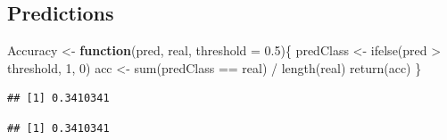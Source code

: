 \documentclass[
]{article}
\newenvironment{Shaded}{\begin{snugshade}}{\end{snugshade}}
\newcommand{\AttributeTok}[1]{\textcolor[rgb]{0.77,0.63,0.00}{#1}}
\newcommand{\ControlFlowTok}[1]{\textcolor[rgb]{0.13,0.29,0.53}{\textbf{#1}}}
\newcommand{\DecValTok}[1]{\textcolor[rgb]{0.00,0.00,0.81}{#1}}
\newcommand{\FloatTok}[1]{\textcolor[rgb]{0.00,0.00,0.81}{#1}}
\newcommand{\FunctionTok}[1]{\textcolor[rgb]{0.00,0.00,0.00}{#1}}
\newcommand{\NormalTok}[1]{#1}
\newcommand{\OtherTok}[1]{\textcolor[rgb]{0.56,0.35,0.01}{#1}}
\newcommand{\SpecialCharTok}[1]{\textcolor[rgb]{0.00,0.00,0.00}{#1}}
\begin{document}
\hypertarget{predictions}{%
\subsection{Predictions}\label{predictions}}

\begin{Shaded}
\begin{Highlighting}[]
\NormalTok{Accuracy }\OtherTok{\textless{}{-}} \ControlFlowTok{function}\NormalTok{(pred, real, }\AttributeTok{threshold =} \FloatTok{0.5}\NormalTok{)\{}
\NormalTok{  predClass }\OtherTok{\textless{}{-}}  \FunctionTok{ifelse}\NormalTok{(pred }\SpecialCharTok{\textgreater{}}\NormalTok{ threshold, }\DecValTok{1}\NormalTok{, }\DecValTok{0}\NormalTok{)}
\NormalTok{  acc }\OtherTok{\textless{}{-}} \FunctionTok{sum}\NormalTok{(predClass }\SpecialCharTok{==}\NormalTok{ real) }\SpecialCharTok{/} \FunctionTok{length}\NormalTok{(real)}
  \FunctionTok{return}\NormalTok{(acc)}
\NormalTok{\}}
\end{Highlighting}
\end{Shaded}

\begin{Shaded}
\end{Shaded}

\begin{verbatim}
## [1] 0.3410341
\end{verbatim}

\begin{Shaded}
\end{Shaded}

\begin{verbatim}
## [1] 0.3410341
\end{verbatim}

\begin{Shaded}
\end{Shaded}
\end{document}
